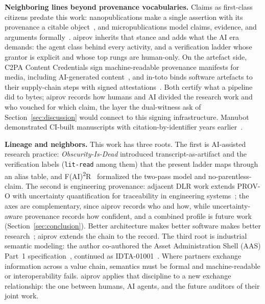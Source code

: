 \textbf{Neighboring lines beyond provenance vocabularies.} Claims
as first-class citizens predate this work: nanopublications make a
single assertion with its provenance a citable
object~\cite{nanopub2010}, and micropublications model claims,
evidence, and arguments formally~\cite{micropub2014}. aiprov
inherits that stance and adds what the AI era demands: the agent
class behind every activity, and a verification ladder whose grantor
is explicit and whose top rungs are human-only. On the artefact
side, C2PA Content Credentials sign machine-readable provenance
manifests for media, including AI-generated
content~\cite{c2pa-spec}, and in-toto binds software artefacts to
their supply-chain steps with signed
attestations~\cite{in-toto2019}. Both certify what a pipeline did
to bytes; aiprov records how humans and AI divided the research work
and who vouched for which claim, the layer the dual-witness ask of
Section~\ref{sec:discussion} would connect to this signing
infrastructure. Manubot demonstrated CI-built manuscripts with
citation-by-identifier years earlier~\cite{manubot2019}.

\textbf{Lineage and neighbors.} This work has three roots. The first
is AI-assisted research practice: \emph{Obscurity-Is-Dead}
\cite{obscurity-is-dead} introduced transcript-as-artifact and the
verification labels (\texttt{lit-read} among them) that the present
ladder maps through an alias table,
and F(AI)\textsuperscript{2}R~\cite{fair2r-repo} formalized the
two-pass model and no-parentless-claim. The second is engineering
provenance: adjacent DLR work extends PROV-O with uncertainty
quantification for traceability in engineering
systems~\cite{uncertainty-prov2026}; the axes are complementary, since
aiprov records who and how, while uncertainty-aware provenance records
how confident, and a combined profile is future work
(Section~\ref{sec:conclusion}). Better architecture makes better software makes better
research~\cite{better-architecture2025}; aiprov extends the chain to
the record. The third root is industrial semantic
modeling: the author co-authored the Asset Administration Shell
(AAS) Part~1 specification~\cite{aas-part1-v30rc02}, continued as
IDTA-01001~\cite{aas-part1-idta}. Where partners exchange information
across a value chain, semantics must be formal and machine-readable or
interoperability fails. aiprov applies that discipline to a new
exchange relationship: the one between humans, AI agents, and the
future auditors of their joint work.
